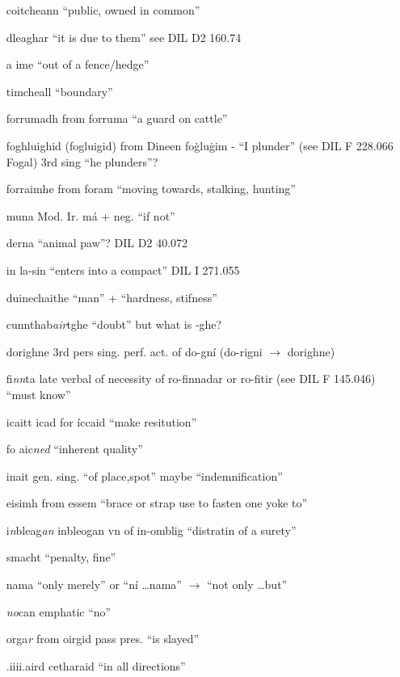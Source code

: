\documentclass[11pt]{article}
\begin{document}
\begin{enumerate}
  \item[coitcheann] \enquote{public, owned in common} 
  \item[dleaghar] \enquote{it is due to them} see DIL D2 160.74 
  \item[a ime] \enquote{out of a fence/hedge}
  \item[timcheall] \enquote{boundary}
  \item[forrumadh] from forruma \enquote{a guard on cattle} 
  \item[foghluighid] (fogluigid) from Dineen fo\.{g}lu\.{g}im - \enquote{I plunder} (see DIL F 228.066 Fogal) 3rd sing \enquote{he plunders}? 
  \item[forraimhe] from foram \enquote{moving towards, stalking, hunting}
  \item[muna] Mod. Ir. m\'{a} + neg. \enquote{if not}
  \item[derna] \enquote{animal paw}? DIL D2 40.072
  \item[in la-sin] \enquote{enters into a compact} DIL I 271.055
  \item[duinechaithe] \enquote{man} + \enquote{hardness, stifness}
  \item[cunnthab\emph{air}tghe] \enquote{doubt} but what is -ghe? 
  \item[dorighne] 3rd pers sing. perf. act. of do-gn\'{i} (do-rigni $\rightarrow$ dorighne)
  \item[fi\emph{nn}ta] late verbal of necessity of ro-finnadar or ro-fitir (see DIL F 145.046) \enquote{must know}
  \item[icaitt] icad for \'{i}ccaid \enquote{make resitution}
  \item[fo aic\emph{ned}] \enquote{inherent quality}
  \item[inait] gen. sing. \enquote{of place,spot} maybe \enquote{indemnification}
  \item[eisimh] from essem \enquote{brace or strap use to fasten one yoke to}
  \item[i\emph{n}bleag\emph{an}] inbleogan vn of in-omblig \enquote{distratin of a surety}
  \item[smacht] \enquote{penalty, fine}
  \item[nama] \enquote{only merely} or \enquote{n\'{i} \ldots nama} $\rightarrow$ \enquote{not only \ldots but} 
  \item[\emph{no}can] emphatic \enquote{no}
  \item[orga\emph{r}] from oirgid pass pres. \enquote{is slayed}
  \item[.iiii.aird] cetharaid \enquote{in all directions}

\end{enumerate}
\end{document}
